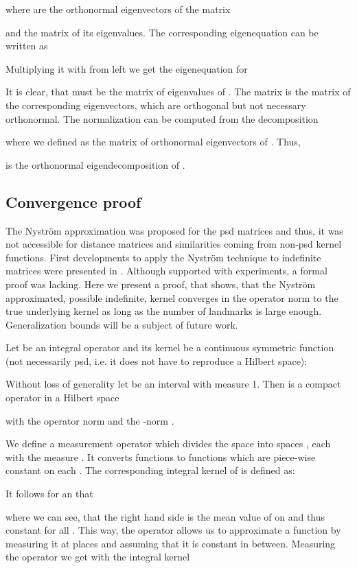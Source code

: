 \documentclass[twoside,11pt]{article}
\begin{document}
where  are the orthonormal eigenvectors of the matrix 

and  the matrix of its eigenvalues.
The corresponding eigenequation can be written as

Multiplying it with  from left
we get the eigenequation for 

It is clear, that  must be the matrix of eigenvalues of .
The matrix  is the matrix of the corresponding eigenvectors,
which are orthogonal but not necessary orthonormal.
The normalization can be computed from the decomposition

where we defined 
as the matrix of orthonormal eigenvectors of .
Thus,

is the orthonormal eigendecomposition of .

\subsection{Convergence proof}
The Nystr\"om approximation was proposed for the psd matrices
and thus, it was not accessible for distance matrices
and similarities coming from non-psd kernel functions.
First developments to apply the Nystr\"om technique to indefinite matrices
were presented in \cite{nips10gismokham,Schleif2012k}.
Although supported with experiments, a formal proof was lacking.
Here we present a proof, that shows, that the Nystr\"om approximated, 
possible indefinite, kernel converges in the operator norm to the true underlying kernel
as long as the number of landmarks is large enough. Generalization bounds will be a subject of future work.

Let  be an integral operator and its kernel
 be a continuous symmetric function (not necessarily psd, i.e. it does not have to reproduce a Hilbert space):

Without loss of generality let  be an interval 
with measure 1.
Then  is a compact operator in a Hilbert space 

with the operator norm  and the -norm .

We define a measurement operator 
which divides the space  into  spaces ,
each with the measure .
It converts functions 
to functions  which are piece-wise constant on each .
The corresponding integral kernel of  is defined as:

It follows for an  that

where we can see, that the right hand side is 
the mean value of  on 
and thus constant for all .
This way, the operator  allows us to approximate a function 
by measuring it at  places  and assuming that it is constant in between.
Measuring the operator  we get  with the integral kernel
\end{document}
